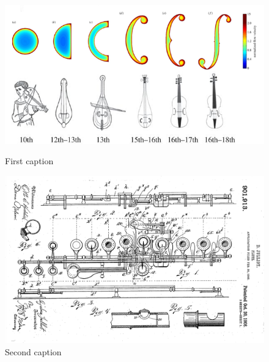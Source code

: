 \begin{figure}[h]
	\centering
	\begin{minipage}{.45\linewidth}
	    \includegraphics[width=\linewidth]{gfx/06_visual_representation/f-hole.png}
	    \caption{First caption}
	    \label{img1}
	\end{minipage}
	\hspace{.05\linewidth}
	\begin{minipage}{.45\linewidth}
	    \includegraphics[width=\linewidth]{gfx/06_visual_representation/Julliot_patent.png}
	    \caption{Second caption}
	    \label{img2}
	\end{minipage}
\end{figure}


